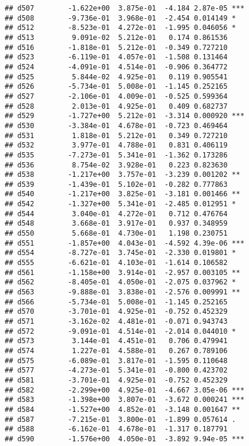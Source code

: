 \documentclass[
]{article}
\begin{document}
\begin{verbatim}
## d507        -1.622e+00  3.875e-01  -4.184 2.87e-05 ***
## d508        -9.736e-01  3.968e-01  -2.454 0.014149 *  
## d512        -8.523e-01  4.272e-01  -1.995 0.046056 *  
## d513         9.091e-02  5.212e-01   0.174 0.861536    
## d516        -1.818e-01  5.212e-01  -0.349 0.727210    
## d523        -6.119e-01  4.057e-01  -1.508 0.131464    
## d524        -4.091e-01  4.514e-01  -0.906 0.364772    
## d525         5.844e-02  4.925e-01   0.119 0.905541    
## d526        -5.734e-01  5.008e-01  -1.145 0.252165    
## d527        -2.106e-01  4.009e-01  -0.525 0.599364    
## d528         2.013e-01  4.925e-01   0.409 0.682737    
## d529        -1.727e+00  5.212e-01  -3.314 0.000920 ***
## d530        -3.384e-01  4.678e-01  -0.723 0.469464    
## d531         1.818e-01  5.212e-01   0.349 0.727210    
## d532         3.977e-01  4.788e-01   0.831 0.406119    
## d535        -7.273e-01  5.341e-01  -1.362 0.173286    
## d536         8.754e-02  3.928e-01   0.223 0.823630    
## d538        -1.217e+00  3.757e-01  -3.239 0.001202 ** 
## d539        -1.439e-01  5.102e-01  -0.282 0.777863    
## d540        -1.217e+00  3.825e-01  -3.181 0.001466 ** 
## d542        -1.327e+00  5.341e-01  -2.485 0.012951 *  
## d544         3.040e-01  4.272e-01   0.712 0.476764    
## d548         3.668e-01  3.917e-01   0.937 0.348959    
## d550         5.668e-01  4.730e-01   1.198 0.230751    
## d551        -1.857e+00  4.043e-01  -4.592 4.39e-06 ***
## d554        -8.727e-01  3.745e-01  -2.330 0.019801 *  
## d555        -6.621e-01  4.103e-01  -1.614 0.106582    
## d561        -1.158e+00  3.914e-01  -2.957 0.003105 ** 
## d562        -8.405e-01  4.050e-01  -2.075 0.037962 *  
## d563        -9.888e-01  3.838e-01  -2.576 0.009991 ** 
## d566        -5.734e-01  5.008e-01  -1.145 0.252165    
## d570        -3.701e-01  4.925e-01  -0.752 0.452329    
## d571        -3.162e-02  4.481e-01  -0.071 0.943743    
## d572        -9.091e-01  4.514e-01  -2.014 0.044010 *  
## d573         3.144e-01  4.451e-01   0.706 0.479941    
## d574         1.227e-01  4.588e-01   0.267 0.789106    
## d575        -6.089e-01  3.817e-01  -1.595 0.110648    
## d577        -4.273e-01  5.341e-01  -0.800 0.423702    
## d581        -3.701e-01  4.925e-01  -0.752 0.452329    
## d582        -2.299e+00  4.925e-01  -4.667 3.05e-06 ***
## d583        -1.398e+00  3.807e-01  -3.672 0.000241 ***
## d584        -1.527e+00  4.852e-01  -3.148 0.001647 ** 
## d587        -7.215e-01  3.800e-01  -1.899 0.057614 .  
## d588        -6.162e-01  4.678e-01  -1.317 0.187791    
## d590        -1.576e+00  4.050e-01  -3.892 9.94e-05 ***

\end{verbatim}
\end{document}
